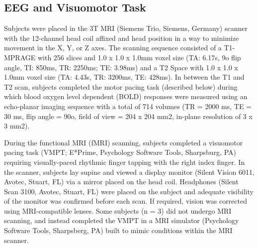 \subsection{EEG and Visuomotor Task}
Subjects were placed in the 3T MRI (Siemens Trio, Siemens, Germany) scanner with the 12-channel head coil affixed and head position in a way to minimize movement in the X, Y, or Z axes. The scanning sequence consisted of a T1-MPRAGE with 256 slices and 1.0 x 1.0 x 1.0mm voxel size (TA: 6.17s, 9o flip angle, TI: 850ms, TR: 2250ms; TE: 3.98ms) and a T2 Space with 1.0 x 1.0 x 1.0mm voxel size (TA: 4.43s, TR: 3200ms, TE: 428ms). In between the T1 and T2 scan, subjects completed the motor pacing task (described below) during which blood oxygen level dependent (BOLD) responses were measured using an echo-planar imaging sequence with a total of 714 volumes (TR = 2000 ms, TE = 30 ms, flip angle = 90o, field of view = 204 x 204 mm2, in-plane resolution of 3 x 3 mm2). 

During the functional MRI (fMRI) scanning, subjects completed a visuomotor pacing task (VMPT; E*Prime, Psychology Software Tools, Sharpsburg, PA) requiring visually-paced rhythmic finger tapping with the right index finger. In the scanner, subjects lay supine and viewed a display monitor (Silent Vision 6011, Avotec, Stuart, FL) via a mirror placed on the head coil. Headphones (Silent Scan 3100, Avotec, Stuart, FL) were placed on the subject and adequate visibility of the monitor was confirmed before each scan. If required, vision was corrected using MRI-compatible lenses. Some subjects (n = 3) did not undergo MRI scanning, and instead completed the VMPT in a MRI simulator (Psychology Software Tools, Sharpsberg, PA) built to mimic conditions within the MRI scanner.


